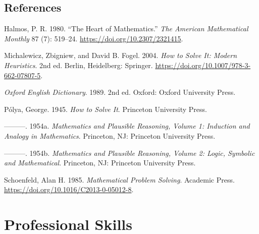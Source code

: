 \documentclass[
  a4paper,
  DIV=11,
  numbers=noendperiod,
  oneside]{scrreprt}
\newlength{\cslhangindent}
\newenvironment{CSLReferences}[2] %
 {\begin{list}{}{%
  \setlength{\itemindent}{0pt}
  \setlength{\leftmargin}{0pt}
  \setlength{\parsep}{0pt}
  \ifodd #1
   \setlength{\leftmargin}{\cslhangindent}
   \setlength{\itemindent}{-1\cslhangindent}
  \fi
  \setlength{\itemsep}{#2\baselineskip}}}
 {\end{list}}
\begin{document}
\chapter*{References}\label{references}


\begingroup
\raggedright

\label{refs}
\begin{CSLReferences}{1}{0}
Halmos, P. R. 1980. {``The Heart of Mathematics.''} \emph{The American
Mathematical Monthly} 87 (7): 519--24.
\url{https://doi.org/10.2307/2321415}.

Michalewicz, Zbigniew, and David B. Fogel. 2004. \emph{{How to Solve It:
Modern Heuristics}}. 2nd ed. Berlin, Heidelberg: Springer.
\url{https://doi.org/10.1007/978-3-662-07807-5}.

\emph{Oxford English Dictionary}. 1989. 2nd ed. Oxford: Oxford
University Press.

Pólya, George. 1945. \emph{{How to Solve It}}. Princeton University
Press.

---------. 1954a. \emph{Mathematics and Plausible Reasoning, Volume 1:
Induction and Analogy in Mathematics}. Princeton, NJ: Princeton
University Press.

---------. 1954b. \emph{Mathematics and Plausible Reasoning, Volume 2:
Logic, Symbolic and Mathematical}. Princeton, NJ: Princeton University
Press.

Schoenfeld, Alan H. 1985. \emph{Mathematical Problem Solving}. Academic
Press. \url{https://doi.org/10.1016/C2013-0-05012-8}.

\end{CSLReferences}

\endgroup

\part{Professional Skills}
\end{document}
